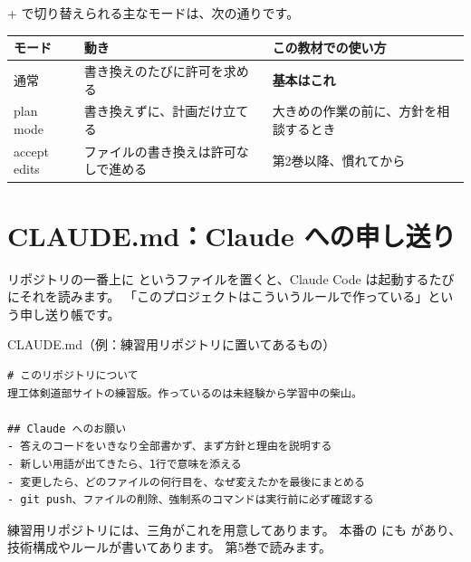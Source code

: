 + で切り替えられる主なモードは、次の通りです。

\begin{center}\small
\begin{tabularx}{\linewidth}{l X l}
\toprule
モード & 動き & この教材での使い方 \\
\midrule
通常 & 書き換えのたびに許可を求める & \textbf{基本はこれ} \\
plan mode & 書き換えずに、計画だけ立てる & 大きめの作業の前に、方針を相談するとき \\
accept edits & ファイルの書き換えは許可なしで進める & 第2巻以降、慣れてから \\
\bottomrule
\end{tabularx}
\end{center}

\section{CLAUDE.md：Claude への申し送り}

リポジトリの一番上に  というファイルを置くと、Claude Code は起動するたびにそれを読みます。
「このプロジェクトはこういうルールで作っている」という申し送り帳です。

\begin{filebox}{CLAUDE.md（例：練習用リポジトリに置いてあるもの）}
\begin{Verbatim}[fontsize=\small]
# このリポジトリについて
理工体剣道部サイトの練習版。作っているのは未経験から学習中の柴山。

## Claude へのお願い
- 答えのコードをいきなり全部書かず、まず方針と理由を説明する
- 新しい用語が出てきたら、1行で意味を添える
- 変更したら、どのファイルの何行目を、なぜ変えたかを最後にまとめる
- git push、ファイルの削除、強制系のコマンドは実行前に必ず確認する
\end{Verbatim}
\end{filebox}

練習用リポジトリには、三角がこれを用意してあります。
本番の  にも  があり、技術構成やルールが書いてあります。
第5巻で読みます。

